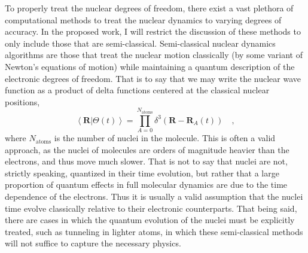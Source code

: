 \documentclass[12pt]{article}
\newcommand{\inner}[2]{\left\langle #1 \left\vert\right. #2 \right\rangle}            %
\newcommand*\vc[1]{\boldsymbol{#1}}
\begin{document}
To properly treat the nuclear degrees of freedom, there exist a vast plethora
of computational methods to treat the nuclear dynamics to varying degrees of
accuracy. In the proposed work, I will restrict the discussion of these methods
to only include those that are semi-classical. Semi-classical nuclear dynamics
algorithms are those that treat the nuclear motion classically (by some variant
of Newton's equations of motion) while maintaining a quantum description of the
electronic degrees of freedom. That is to say that we may write the nuclear 
wave function as a product of delta functions centered at the classical nuclear
positions,
\begin{equation}
\inner{\vc{R}}{\Theta (t)} = 
  \prod_{A = 0}^{N_\mathrm{atoms}} \delta^3(\vc{R} - \vc{R}_A(t))
  \quad,
  \label{eq:ClassicalNuclei}
\end{equation}
where $N_\mathrm{atoms}$ is the number of nuclei in the molecule.  This is
often a valid approach, as the nuclei of molecules are orders of magnitude
heavier than the electrons, and thus move much slower. That is not to say that
nuclei are not, strictly speaking, quantized in their time evolution, but
rather that a large proportion of quantum effects in full molecular dynamics
are due to the time dependence of the electrons. Thus it is usually a valid
assumption that the nuclei time evolve classically relative to their electronic
counterparts. That being said, there are cases in which the quantum evolution
of the nuclei must be explicitly treated, such as tunneling in lighter atoms,
in which these semi-classical methods will not suffice to capture the necessary
physics.
\end{document}
